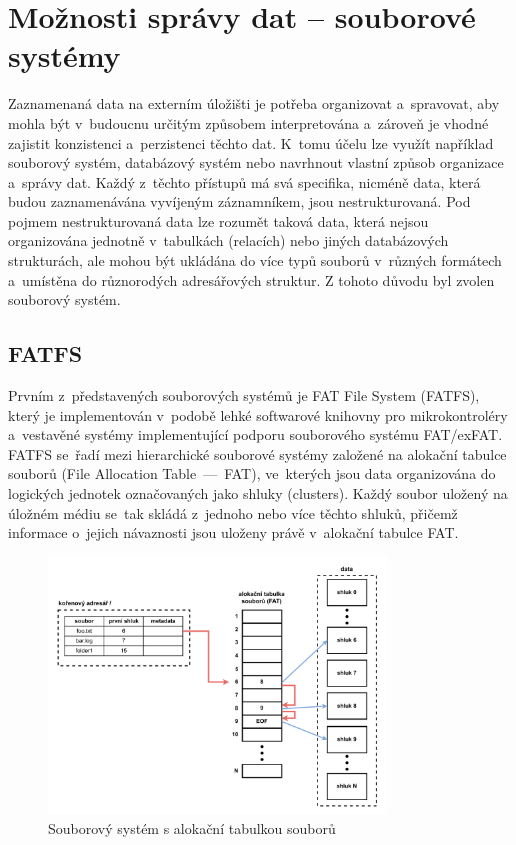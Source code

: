 \section{Možnosti správy dat -- souborové systémy}
Zaznamenaná data na externím úložišti je potřeba organizovat a~spravovat, aby mohla být v~budoucnu určitým způsobem interpretována a~zároveň je vhodné zajistit konzistenci a~perzistenci těchto dat. K~tomu účelu lze využít například souborový systém, databázový systém nebo navrhnout vlastní způsob organizace a~správy dat. Každý z~těchto přístupů má svá specifika, nicméně data, která budou zaznamenávána vyvíjeným záznamníkem, jsou nestrukturovaná. Pod pojmem nestrukturovaná data lze rozumět taková data, která nejsou organizována jednotně v~tabulkách (relacích) nebo jiných databázových strukturách, ale mohou být ukládána do více typů souborů v~různých formátech a~umístěna do různorodých adresářových struktur. Z tohoto důvodu byl zvolen souborový systém.~\cite{weka_structured_unstructured_data, virginia_tech_file_database_systems}

\subsection{FATFS}
\label{fatfs}
Prvním z~představených souborových systémů je FAT File System (FATFS), který je implementován v~podobě lehké softwarové knihovny pro mikrokontroléry a~vestavěné systémy implementující podporu souborového systému FAT/exFAT. FATFS se~řadí mezi hierarchické souborové systémy založené na alokační tabulce souborů (File Allocation Table~––~FAT), ve~kterých jsou data organizována do logických jednotek označovaných jako shluky (clusters). Každý soubor uložený na úložném médiu se~tak skládá z~jednoho nebo více těchto shluků, přičemž informace o~jejich návaznosti jsou uloženy právě v~alokační tabulce FAT.~\cite{elm_fat_filesystem_docs, recoverit_fat_filesystem}

\begin{figure}[h]
    \centering
    \includegraphics[width=0.80\textwidth]{obrazky-figures/fat_file_system-cz.pdf}
    
    \caption{Souborový systém s alokační tabulkou souborů~\cite{recoverit_fat_filesystem}}
    \label{fig:fat-file-system-structure}
\end{figure}

